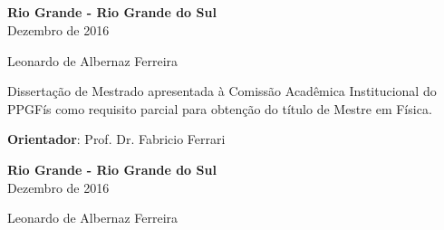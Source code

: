 \documentclass[12pt, a4paper]{report}
\begin{document}
\begin{center}
 \\
 \\
 \\
 \\

\vspace{4cm}


\vspace{4.5cm}


\vspace{5.5cm}

\textbf{Rio Grande - Rio Grande do Sul} \\
Dezembro de 2016
\end{center}


\newpage
\begin{center}

\vspace{4cm}

\large{Leonardo de Albernaz Ferreira}
\end{center}

\vspace{4cm}

\begin{flushright}
\begin{minipage}{8.6cm}
Dissertação de Mestrado apresentada à \mbox{Comissão} 
Acadêmica Institucional do PPGFís como 
requisito parcial para obtenção 
do título de Mestre em \mbox{Física}.

\vspace{0.5cm}
\textbf{Orientador}: Prof. Dr. Fabricio Ferrari

\end{minipage}
\end{flushright}
 
\vspace{8cm}


\begin{center}
\textbf{Rio Grande - Rio Grande do Sul} \\
Dezembro de 2016
\end{center}


\newpage
\begin{center}

\vspace{2.2cm}

\large{Leonardo de Albernaz Ferreira}
\end{center}
\end{document}
